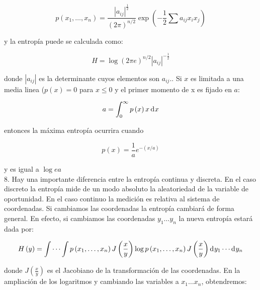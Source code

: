 \begin{equation}
p\left ( x_{1}, \ldots ,x_{n} \right )=\frac{\left | a_{ij} \right |^{\frac{1}{2}}}{\left ( 2\pi  \right )^{n/2}}\exp \left ( -\frac{1}{2} \sum a_{ij}x_{i}x_{j} \right)
\end{equation}

y la entrop\'ia puede se calculada como:

\begin{equation}
H=\log \left ( 2\pi e \right )^{n/2}\left | a_{ij} \right |^{-\frac{1}{2}}
\end{equation}

donde $\left |a_{ij}  \right | $ es la determinante cuyos elementos son $a_{ij}$.\newline {}. Si $x$ es limitada a una media linea ($p\left ( x \right )=0$ para $x\leq0$ y el primer momento de x es fijado en $a$:

\begin{equation}
a=\int_{0}^{\infty}p\left ( x \right )x \diff x 
\end{equation}

entonces la m\'axima entrop\'ia ocurrira cuando

\begin{equation}
p\left ( x \right )=\frac{1}{a}e^{-\left ( x/a \right )}
\end{equation}

y es igual a $\log ea$
\\

8. Hay una importante diferencia entre la entrop\'ia continua y discreta. En el caso discreto la entrop\'ia mide de un modo absoluto la aleatoriedad de la variable de oportunidad. En el caso continuo la medici\'on es relativa al sistema de coordenadas. Si cambiamos las coordenadas la entrop\'ia cambiar\'a de forma general. En efecto, si cambiamos las coordenadas $y_{1} \dots y_{n}$ la nueva entrop\'ia estar\'a dada por:

\begin{equation}
H\left ( y \right )=\int \cdots \int p\left ( x_{1}, \ldots ,x_{n} \right )J\left ( \frac{x}{y} \right )\log p\left ( x_{1}, \ldots ,x_{n} \right )J\left ( \frac{x}{y} \right ) \diff y _{1}\cdots  \diff y _{n}
\end{equation}

donde $J\left ( \frac{x}{y} \right )$ es el Jacobiano de la transformaci\'on de las coordenadas. En la ampliaci\'on de los logaritmos y cambiando las variables a $x_{1}\dots x_{n}$, obtendremos:

